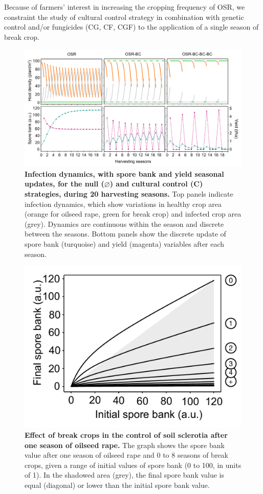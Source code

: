 \documentclass{article}
\begin{document}
 Because of farmers' interest in increasing the cropping frequency of OSR, we constraint the study of cultural control strategy in combination with genetic control and/or fungicides (CG, CF, CGF) to the application of a single season of break crop.
 
 \begin{figure}
 \includegraphics[width=\columnwidth]{SCL_Fig/SCL_FigA.pdf}
\caption{\label{fig:figA}\textbf{Infection dynamics, with spore bank and yield seasonal updates, for the null ($\varnothing$) and cultural control (C) strategies, during 20 harvesting seasons.} Top panels indicate infection dynamics, which show variations in healthy crop area (orange for oilseed rape, green for break crop) and infected crop area (grey). Dynamics are continuous within the season and discrete between the seasons. Bottom panels show the discrete update of spore bank (turquoise) and yield (magenta) variables after each season. }
\end{figure}
 
  \begin{figure}
 \includegraphics[width=0.75\columnwidth]{SCL_Fig/SCL_FigB.pdf}
\caption{\label{fig:figB}\textbf{Effect of break crops in the control of soil sclerotia after one season of oilseed rape.} The graph shows the spore bank value after one season of oilseed rape and 0 to 8 seasons of break crops, given a range of initial values of spore bank (0 to 100, in units of 1). In the shadowed area (grey), the final spore bank value is equal (diagonal) or lower than the initial spore bank value. }
\end{figure}
 
\end{document}
